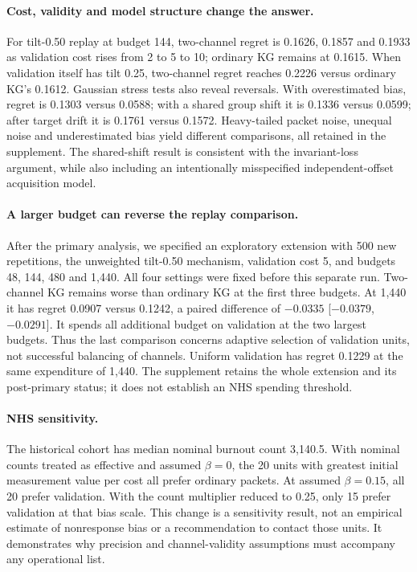 \paragraph{Cost, validity and model structure change the answer.}
For tilt-0.50 replay at budget 144, two-channel regret is 0.1626, 0.1857 and 0.1933 as validation cost rises from 2 to 5 to 10; ordinary KG remains at 0.1615. When validation itself has tilt 0.25, two-channel regret reaches 0.2226 versus ordinary KG's 0.1612. Gaussian stress tests also reveal reversals. With overestimated bias, regret is 0.1303 versus 0.0588; with a shared group shift it is 0.1336 versus 0.0599; after target drift it is 0.1761 versus 0.1572. Heavy-tailed packet noise, unequal noise and underestimated bias yield different comparisons, all retained in the supplement. The shared-shift result is consistent with the invariant-loss argument, while also including an intentionally misspecified independent-offset acquisition model.

\paragraph{A larger budget can reverse the replay comparison.}
After the primary analysis, we specified an exploratory extension with 500 new repetitions, the unweighted tilt-0.50 mechanism, validation cost 5, and budgets 48, 144, 480 and 1,440. All four settings were fixed before this separate run. Two-channel KG remains worse than ordinary KG at the first three budgets. At 1,440 it has regret 0.0907 versus 0.1242, a paired difference of $-0.0335$ [$-0.0379$,$-0.0291$]. It spends all additional budget on validation at the two largest budgets. Thus the last comparison concerns adaptive selection of validation units, not successful balancing of channels. Uniform validation has regret 0.1229 at the same expenditure of 1,440. The supplement retains the whole extension and its post-primary status; it does not establish an NHS spending threshold.

\paragraph{NHS sensitivity.}
The historical cohort has median nominal burnout count 3,140.5. With nominal counts treated as effective and assumed $\beta=0$, the 20 units with greatest initial measurement value per cost all prefer ordinary packets. At assumed $\beta=0.15$, all 20 prefer validation. With the count multiplier reduced to 0.25, only 15 prefer validation at that bias scale. This change is a sensitivity result, not an empirical estimate of nonresponse bias or a recommendation to contact those units. It demonstrates why precision and channel-validity assumptions must accompany any operational list.

